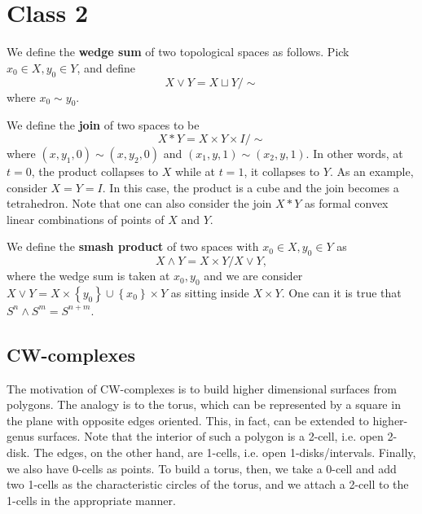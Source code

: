 \documentclass{../mathnotes}
\begin{document}
\section*{Class 2}

\begin{defn}
    We define the \textbf{wedge sum} of two topological spaces as follows. Pick $x_0\in X,y_0\in Y$, and define
    \[X\vee Y=X\sqcup Y/\sim\]
    where $x_0\sim y_0$.
\end{defn}

\begin{defn}
    We define the \textbf{join} of two spaces to be
    \[X*Y=X\times Y\times I/\sim\]
    where $(x,y_1,0)\sim (x,y_2,0)$ and $(x_1,y,1)\sim (x_2,y,1)$. In other words, at $t=0$,
    the product collapses to $X$ while at $t=1$, it collapses to $Y$. As an example, consider $X=Y=I$.
    In this case, the product is a cube and the join becomes a tetrahedron. Note that one can also
    consider the join $X*Y$ as formal convex linear combinations of points of $X$ and $Y$.
\end{defn}

\begin{defn}
    We define the \textbf{smash product} of two spaces with $x_0\in X,y_0\in Y$ as
    \[X\wedge Y=X\times Y/X\vee Y,\]
    where the wedge sum is taken at $x_0,y_0$ and we are consider $X\vee Y=X\times \left\{ y_0 \right\}\cup \left\{ x_0 \right\}\times Y$
    as sitting inside $X\times Y$. One can it is true that $S^n\wedge S^m=S^{n+m}$.
\end{defn}

\subsection{CW-complexes}

The motivation of CW-complexes is to build higher dimensional surfaces from polygons. The analogy is to
the torus, which can be represented by a square in the plane with opposite edges oriented. This, in fact,
can be extended to higher-genus surfaces. Note that the interior of such a polygon is a 2-cell, i.e. open 2-disk.
The edges, on the other hand, are 1-cells, i.e. open 1-disks/intervals. Finally, we also have 0-cells as points.
To build a torus, then, we take a 0-cell and add two 1-cells as the characteristic circles of the torus, and
we attach a 2-cell to the 1-cells in the appropriate manner.
\end{document}

